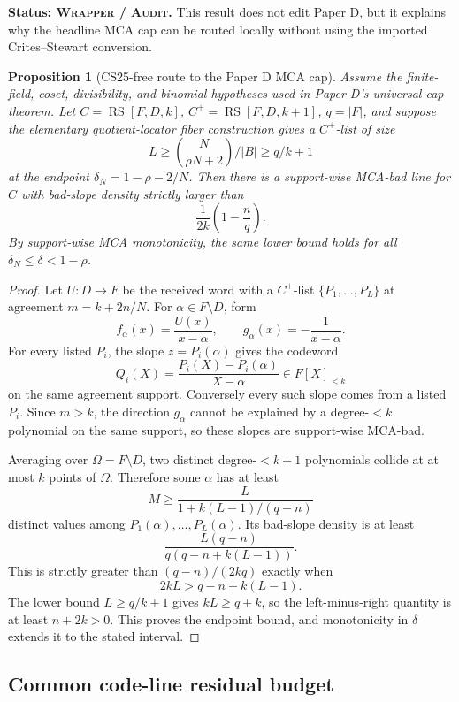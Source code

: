 \documentclass[11pt]{article}
\newtheorem{proposition}{Proposition}
\newcommand{\RS}{\operatorname{RS}}
\begin{document}
\textbf{Status: \textsc{Wrapper} / \textsc{Audit}.}
This result does not edit Paper D, but it explains why the headline MCA cap can
be routed locally without using the imported Crites--Stewart conversion.

\begin{proposition}[CS25-free route to the Paper D MCA cap]
\label{prop:deep-point-cap}
Assume the finite-field, coset, divisibility, and binomial hypotheses used in
Paper D's universal cap theorem.  Let \(C=\RS[F,D,k]\), \(C^+=\RS[F,D,k+1]\),
\(q=|F|\), and suppose the elementary quotient-locator fiber construction gives
a \(C^+\)-list of size
\[
  L\ge \binom{N}{\rho N+2}/|B|\ge q/k+1
\]
at the endpoint \(\delta_N=1-\rho-2/N\).  Then there is a support-wise MCA-bad
line for \(C\) with bad-slope density strictly larger than
\[
  \frac1{2k}\left(1-\frac nq\right).
\]
By support-wise MCA monotonicity, the same lower bound holds for all
\(\delta_N\le\delta<1-\rho\).
\end{proposition}

\begin{proof}
Let \(U:D\to F\) be the received word with a \(C^+\)-list
\(\{P_1,\ldots,P_L\}\) at agreement \(m=k+2n/N\).  For
\(\alpha\in F\setminus D\), form
\[
  f_\alpha(x)=\frac{U(x)}{x-\alpha},
  \qquad
  g_\alpha(x)=-\frac1{x-\alpha}.
\]
For every listed \(P_i\), the slope \(z=P_i(\alpha)\) gives the codeword
\[
  Q_i(X)=\frac{P_i(X)-P_i(\alpha)}{X-\alpha}\in F[X]_{<k}
\]
on the same agreement support.  Conversely every such slope comes from a
listed \(P_i\).  Since \(m>k\), the direction \(g_\alpha\) cannot be explained
by a degree-\(<k\) polynomial on the same support, so these slopes are
support-wise MCA-bad.

Averaging over \(\Omega=F\setminus D\), two distinct degree-\(<k+1\)
polynomials collide at at most \(k\) points of \(\Omega\).  Therefore some
\(\alpha\) has at least
\[
  M\ge \frac{L}{1+k(L-1)/(q-n)}
\]
distinct values among \(P_1(\alpha),\ldots,P_L(\alpha)\).  Its bad-slope
density is at least
\[
  \frac{L(q-n)}{q(q-n+k(L-1))}.
\]
This is strictly greater than \((q-n)/(2kq)\) exactly when
\[
  2kL>q-n+k(L-1).
\]
The lower bound \(L\ge q/k+1\) gives \(kL\ge q+k\), so the left-minus-right
quantity is at least \(n+2k>0\).  This proves the endpoint bound, and
monotonicity in \(\delta\) extends it to the stated interval.
\end{proof}

\subsection{Common code-line residual budget}
\end{document}
